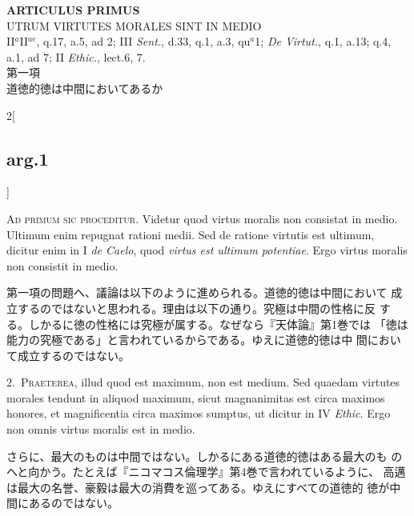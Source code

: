 \documentclass[paper=a4paper,fontsize=10pt,jafontsize=9pt,titlepage]{jlreq}
\begin{document}
\begin{center}
{\Large {\bfseries ARTICULUS PRIMUS}}\\
{\large UTRUM VIRTUTES MORALES SINT IN MEDIO}\\
{\footnotesize II$^{a}$II$^{ae}$, q.17, a.5, ad 2; III {\itshape Sent.}, d.33, q.1, a.3, qu$^{a}$1; {\itshape De Virtut.}, q.1, a.13; q.4, a.1, ad 7; II {\itshape Ethic.}, lect.6, 7.}\\
{\Large 第一項\\道徳的徳は中間においてあるか}
\end{center}

\begin{paracol}{2}[\subsection{arg.1}]

{\scshape Ad primum sic proceditur}. Videtur quod virtus moralis non
consistat in medio. Ultimum enim repugnat rationi medii. Sed de
ratione virtutis est ultimum, dicitur enim in I {\itshape de Caelo},
quod {\itshape virtus est ultimum potentiae}. Ergo virtus moralis non
consistit in medio.

\switchcolumn

第一項の問題へ、議論は以下のように進められる。道徳的徳は中間において
 成立するのではないと思われる。理由は以下の通り。究極は中間の性格に反
 する。しかるに徳の性格には究極が属する。なぜなら『天体論』第1巻では
 「徳は能力の究極である」と言われているからである。ゆえに道徳的徳は中
 間において成立するのではない。


2.~{\scshape Praeterea}, illud quod est maximum, non est medium. Sed
quaedam virtutes morales tendunt in aliquod maximum, sicut
magnanimitas est circa maximos honores, et magnificentia circa maximos
sumptus, ut dicitur in IV {\itshape Ethic}. Ergo non omnis virtus
moralis est in medio.

\switchcolumn

さらに、最大のものは中間ではない。しかるにある道徳的徳はある最大のも
 のへと向かう。たとえば『ニコマコス倫理学』第4巻で言われているように、
 高邁は最大の名誉、豪毅は最大の消費を巡ってある。ゆえにすべての道徳的
 徳が中間にあるのではない。



\end{paracol}
\end{document}
